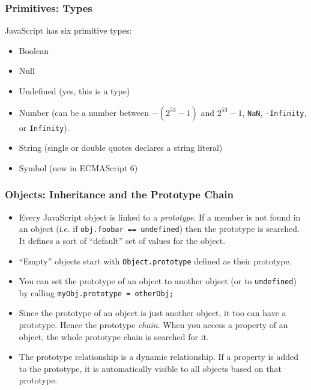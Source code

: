 \documentclass{lug}
\begin{document}
\begin{frame}
    \frametitle{Primitives: Types\footnotemark[1]}

    JavaScript has six primitive types:

    \begin{itemize}
        \item Boolean
        \item Null
        \item Undefined (yes, this is a type)
        \item Number (can be a number between $-(2^{53} - 1)$ and $2^{53} - 1$, \texttt{NaN},
            \texttt{-Infinity}, or \texttt{Infinity}).
        \item String (single or double quotes declares a string literal\footnotemark[2])
        \item Symbol (new in ECMAScript 6)
    \end{itemize}

\end{frame}

\begin{frame}
    \frametitle{Objects: Inheritance and the Prototype Chain}

    \begin{itemize}[<+->]
        \item Every JavaScript object is linked to a \textit{prototype}. If a member is not found in
            an object (i.e. if \texttt{obj.foobar == undefined}) then the prototype is searched. It
            defines a sort of ``default'' set of values for the object.

        \item ``Empty'' objects start with \texttt{Object.prototype} defined as their prototype.

        \item You can set the prototype of an object to another object (or to \texttt{undefined}) by
            calling \texttt{myObj.prototype = otherObj;}

        \item Since the prototype of an object is just another object, it too can have a prototype.
            Hence the prototype \textit{chain}. When you access a property of an object, the whole
            prototype chain is searched for it.

        \item The prototype relationship is a dynamic relationship. If a property is added to the
            prototype, it is automatically visible to all objects based on that prototype.
    \end{itemize}

\end{frame}
\end{document}
